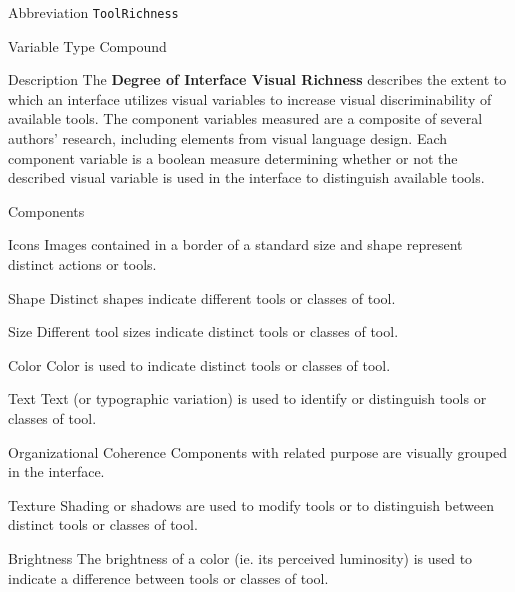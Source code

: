 \begin{AlignedDesc}
  \item[Abbreviation] \texttt{ToolRichness}

  \item[Variable Type] Compound

  \item[Description] The \textbf{Degree of Interface Visual Richness}
  describes the extent to which an interface utilizes visual variables to
  increase visual discriminability of available tools. The component
  variables measured are a composite of several authors' research,
  including elements from visual language design. Each component variable
  is a boolean measure determining whether or not the described visual
  variable is used in the interface to distinguish available tools.

  \item[Components]

  \begin{AlignedDesc}
    \item[Icons] Images contained in a border of a standard size and shape
    represent distinct actions or tools. \cite{costagliola2002,moody2009}
    \item[Shape] Distinct shapes indicate different tools or classes of
    tool. \cite{moody2009}
    \item[Size] Different tool sizes indicate distinct tools or classes
    of tool. \cite{moody2009}
    \item[Color] Color is used to indicate distinct tools or classes of
    tool. \cite{moody2009}
    \item[Text] Text (or typographic variation) is used to identify or
    distinguish tools or classes of tool. \cite{moody2009}
    \item[Organizational Coherence] Components with related purpose are
    visually grouped in the interface. \cite{constantine1996}
    \item[Texture] Shading or shadows are used to modify tools or to
    distinguish between distinct tools or classes of tool. \cite{moody2009}
    \item[Brightness] The brightness of a color (ie. its perceived
    luminosity) is used to indicate a difference between tools or classes
    of tool. \cite{moody2009}
  \end{AlignedDesc}

\end{AlignedDesc}

